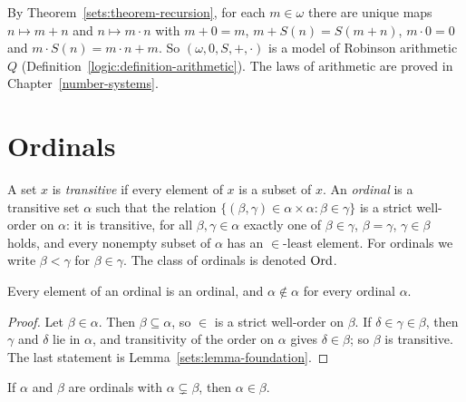 \begin{example}\label{sets:example-arithmetic}
By Theorem~\ref{sets:theorem-recursion}, for each $m \in \omega$ there are unique
maps $n \mapsto m + n$ and $n \mapsto m \cdot n$ with $m + 0 = m$,
$m + S(n) = S(m + n)$, $m \cdot 0 = 0$ and $m \cdot S(n) = m \cdot n + m$. So
$(\omega, 0, S, +, \cdot)$ is a model of Robinson arithmetic $Q$
(Definition~\ref{logic:definition-arithmetic}). The laws of arithmetic are
proved in Chapter~\ref{number-systems}.
\end{example}

\section{Ordinals}\label{sets:section-ordinals}

\begin{definition}\label{sets:definition-ordinal}
A set $x$ is \emph{transitive} if every element of $x$ is a subset of $x$. An
\emph{ordinal} is a transitive set $\alpha$ such that the relation
$\{(\beta, \gamma) \in \alpha \times \alpha : \beta \in \gamma\}$ is a strict
well-order on $\alpha$: it is transitive, for all $\beta, \gamma \in \alpha$
exactly one of $\beta \in \gamma$, $\beta = \gamma$, $\gamma \in \beta$ holds,
and every nonempty subset of $\alpha$ has an $\in$-least element. For ordinals
we write $\beta < \gamma$ for $\beta \in \gamma$. The class of ordinals is
denoted $\mathrm{Ord}$.
\end{definition}

\begin{lemma}\label{sets:lemma-ordinal-elements}
Every element of an ordinal is an ordinal, and $\alpha \notin \alpha$ for every
ordinal $\alpha$.
\end{lemma}

\begin{proof}
Let $\beta \in \alpha$. Then $\beta \subseteq \alpha$, so $\in$ is a strict
well-order on $\beta$. If $\delta \in \gamma \in \beta$, then $\gamma$ and
$\delta$ lie in $\alpha$, and transitivity of the order on $\alpha$ gives
$\delta \in \beta$; so $\beta$ is transitive. The last statement is
Lemma~\ref{sets:lemma-foundation}.
\end{proof}

\begin{lemma}\label{sets:lemma-ordinal-subset}
If $\alpha$ and $\beta$ are ordinals with $\alpha \subsetneq \beta$, then
$\alpha \in \beta$.
\end{lemma}

